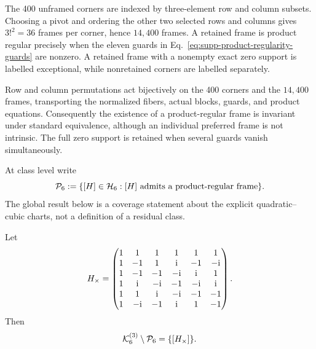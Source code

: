 The 400 unframed corners are indexed by three-element row and column subsets.  Choosing a pivot and ordering the other two selected rows and columns gives $3!^2=36$ frames per corner, hence $14{,}400$ frames.  A retained frame is product regular precisely when the eleven guards in Eq.~\eqref{eq:supp-product-regularity-guards} are nonzero.  A retained frame with a nonempty exact zero support is labelled exceptional, while nonretained corners are labelled separately.

Row and column permutations act bijectively on the 400 corners and the $14{,}400$ frames, transporting the normalized fibers, actual blocks, guards, and product equations. Consequently the existence of a product-regular frame is invariant under standard equivalence, although an individual preferred frame is not intrinsic. The full zero support is retained when several guards vanish simultaneously.

At class level write
\begin{equation}
\mathcal P_6:=\{[H]\in\mathcal H_6:\text{$[H]$ admits a product-regular frame}\}.
\label{eq:supp-product-regular-class-locus}
\end{equation}
The global result below is a coverage statement about the explicit quadratic--cubic charts, not a definition of a residual class.


\begin{proposition}
\label{prop:supp-karlsson-product-exceptional-singleton}
Let
\begin{equation}
H_\times=
\begin{pmatrix}
1&1&1&1&1&1\\
1&-1&1&\mathrm i&-1&-\mathrm i\\
1&-1&-1&-\mathrm i&\mathrm i&1\\
1&\mathrm i&-\mathrm i&-1&-\mathrm i&\mathrm i\\
1&1&\mathrm i&-\mathrm i&-1&-1\\
1&-\mathrm i&-1&\mathrm i&1&-1
\end{pmatrix}.
\label{eq:supp-product-exceptional-karlsson-matrix}
\end{equation}
Then
\begin{equation}
\mathcal K_6^{(3)}\setminus\mathcal P_6=\{[H_\times]\}.
\label{eq:supp-karlsson-product-exceptional-singleton}
\end{equation}
\end{proposition}

